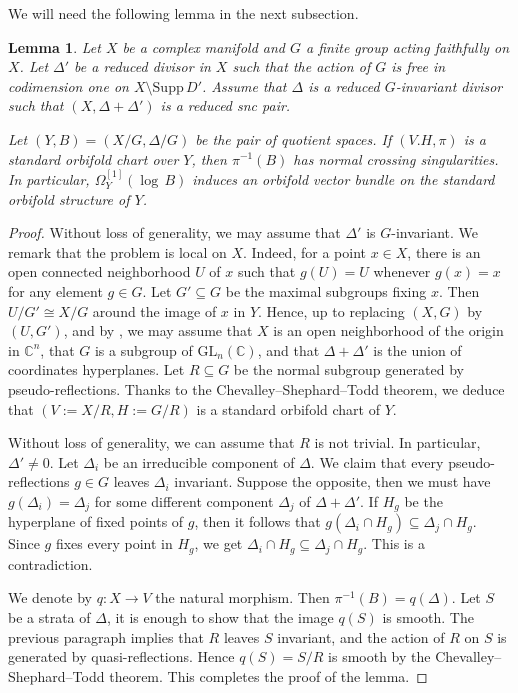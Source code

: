 \documentclass[12pt]{amsart}
\newcommand{\<}{\leq}
\newcommand{\D}{\Delta}
\newtheorem{lemma}[theorem]{Lemma}
\theoremstyle{remark}
\theoremstyle{definition}
\theoremstyle{definition}
\numberwithin{equation}{section}
\theoremstyle{definition}
\theoremstyle{definition}
\begin{document}
We will need the following lemma in the next subsection. 

\begin{lemma}
    \label{lemma:orbifold-snc}
   Let $X$ be a complex manifold and $G$ a finite group acting faithfully on $X$. 
  Let $\D'$ be a reduced divisor in $X$ such that the action of $G$ is free in codimension one on $X\setminus \mathrm{Supp}\, D'$. 
   Assume that  $\D$ is a reduced $G$-invariant divisor such that $(X,\D+\D')$ is a reduced snc pair. 
   
   Let $(Y,B) = (X/G, \D/G)$ be the  pair of quotient spaces.  
   If $(V.H,\pi)$ is a standard orbifold chart over $Y$, then $\pi^{-1}(B)$  has normal crossing  singularities. 
   In particular, $\Omega_Y^{[1]}(\log\, B)$ induces  an orbifold vector bundle on the standard orbifold structure of $Y$. 
\end{lemma}

\begin{proof} 
Without loss of generality, we may assume that $\D'$ is $G$-invariant.  
We remark that the problem is local on $X$.  
Indeed, for a point $x\in X$, there is an open  connected neighborhood $U$ of $x$ such that $g(U)= U$ whenever $g(x)=x$ for any element $g\in G$.  
Let $G'\subseteq G$ be the maximal subgroups fixing $x$.
Then $U/G' \cong X/G$ around the image of $x$ in $Y$. 
Hence, up to replacing $(X,G)$ by $(U,G')$, and by \cite[Lemma 9.9]{Kaw88}, we may assume that $X$ is an open neighborhood of the origin in $\mathbb{C}^n$, that $G$ is a subgroup of $\mathrm{GL}_n(\mathbb{C})$, and that $\D+\D'$ is the union of coordinates hyperplanes.  
Let $R\subseteq G$ be the normal subgroup generated by pseudo-reflections. 
Thanks to the Chevalley–Shephard–Todd theorem, we deduce that $(V:=X/R,  H:= G/R)$ is a standard orbifold chart  of  $Y$.   

Without loss of generality, we can assume that $R$ is not trivial. 
In particular, $\D'\neq 0$. 
Let $\D_i$ be an irreducible component of $\D$. 
We claim that every pseudo-reflections $g\in G$ leaves $\D_i$ invariant. 
Suppose the opposite, then we must have $g(\D_i)=\D_j$ for some different component $\D_j$ of $\D+\D'$. 
If $H_g$ be the hyperplane of fixed points of $g$, then it follows that $g(\D_i\cap H_g) \subseteq \D_j \cap H_g$. 
Since $g$ fixes every point in $H_g$, we get  $\D_i\cap H_g \subseteq \D_j \cap H_g$.  
This is a contradiction.



We denote by $q\colon X\to V$ the natural morphism. 
Then $\pi^{-1}(B) = q(\D)$. 
Let   $S$ be a strata of $\D$,  it is enough to show that the image $q(S)$ is smooth.  
The previous paragraph implies that $R$ leaves $S$ invariant, and the action of $R$ on $S$ is generated by quasi-reflections. 
Hence $q(S)=S/R$ is smooth by the  Chevalley–Shephard–Todd theorem.  
This completes the proof of the lemma.
\end{proof}
\end{document}
